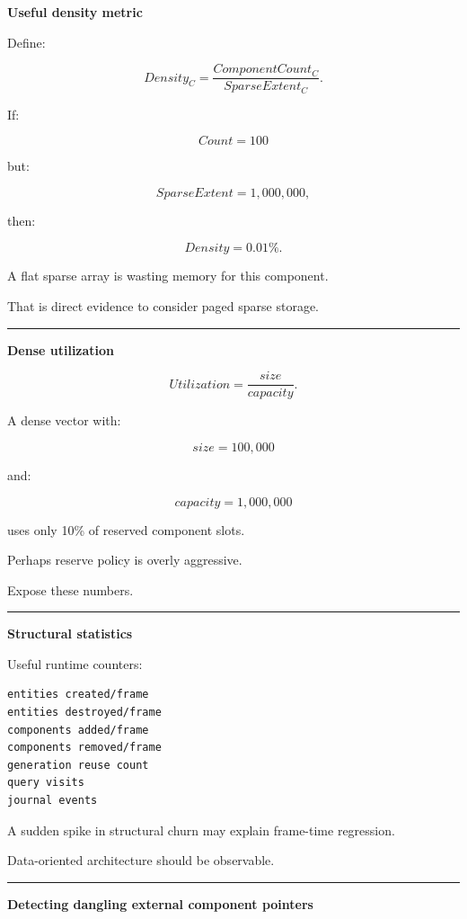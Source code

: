 \textbf{Useful density metric}

Define:

\[
Density_C=
\frac{ComponentCount_C}
{SparseExtent_C}.
\]

If:

\[
Count=100
\]

but:

\[
SparseExtent=1,000,000,
\]

then:

\[
Density=0.01\%.
\]

A flat sparse array is wasting memory for this component.

That is direct evidence to consider paged sparse storage.

\begin{center}\rule{0.5\linewidth}{0.5pt}\end{center}

\textbf{Dense utilization}

\[
Utilization=
\frac{size}
{capacity}.
\]

A dense vector with:

\[
size=100,000
\]

and:

\[
capacity=1,000,000
\]

uses only 10\% of reserved component slots.

Perhaps reserve policy is overly aggressive.

Expose these numbers.

\begin{center}\rule{0.5\linewidth}{0.5pt}\end{center}

\textbf{Structural statistics}

Useful runtime counters:

\begin{verbatim}
entities created/frame
entities destroyed/frame
components added/frame
components removed/frame
generation reuse count
query visits
journal events
\end{verbatim}

A sudden spike in structural churn may explain frame-time regression.

Data-oriented architecture should be observable.

\begin{center}\rule{0.5\linewidth}{0.5pt}\end{center}

\textbf{Detecting dangling external component pointers}

